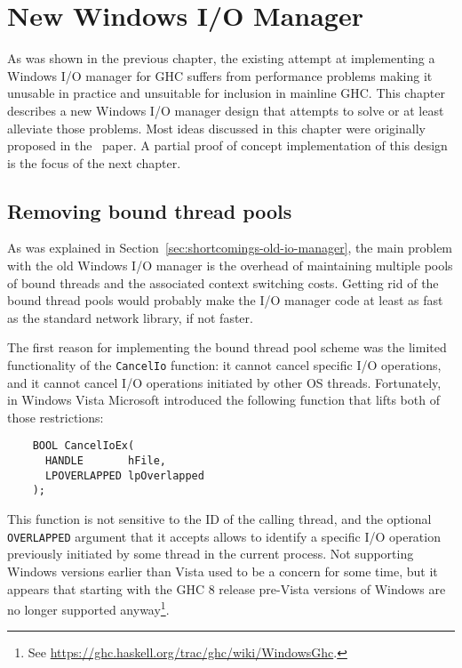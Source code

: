 \documentclass[a4paper,11pt,oneside]{report}
\begin{document}
\chapter{New Windows I/O Manager}
\label{chap:new-io-manager}

As was shown in the previous chapter, the existing attempt at implementing a
Windows I/O manager for GHC suffers from performance problems making it unusable
in practice and unsuitable for inclusion in mainline GHC. This chapter describes
a new Windows I/O manager design that attempts to solve or at least alleviate
those problems. Most ideas discussed in this chapter were originally proposed in
the~\cite{bib:voellmy} paper. A partial proof of concept implementation of this
design is the focus of the next chapter.

\section{Removing bound thread pools}
\label{sec:bound-thread-pools}

As was explained in Section~\ref{sec:shortcomings-old-io-manager}, the main
problem with the old Windows I/O manager is the overhead of maintaining multiple
pools of bound threads and the associated context switching costs. Getting rid
of the bound thread pools would probably make the I/O manager code at least as
fast as the standard network library, if not faster.

The first reason for implementing the bound thread pool scheme was the limited
functionality of the \texttt{CancelIo} function: it cannot cancel specific I/O
operations, and it cannot cancel I/O operations initiated by other OS
threads. Fortunately, in Windows Vista Microsoft introduced the following
function that lifts both of those restrictions:

\begin{verbatim}
    BOOL CancelIoEx(
      HANDLE       hFile,
      LPOVERLAPPED lpOverlapped
    );
\end{verbatim}

This function is not sensitive to the ID of the calling thread, and the optional
\texttt{OVERLAPPED} argument that it accepts allows to identify a specific I/O
operation previously initiated by some thread in the current process. Not
supporting Windows versions earlier than Vista used to be a concern for some
time, but it appears that starting with the GHC 8 release pre-Vista versions of
Windows are no longer supported anyway\footnote{See
  \url{https://ghc.haskell.org/trac/ghc/wiki/WindowsGhc}.}.
\end{document}
